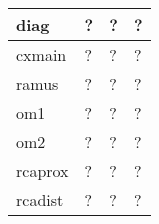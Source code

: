 \documentclass[a4paper,12pt]{article}
\begin{document}
\begin{adjustbox}{width=1\textwidth}
\begin{tabular}{|l|l|l|l|}
diag          & ?                                                              & ?             & ?                                                                                                                                                                                                                                                                                    \\ \hline
cxmain        & ?                                                              & ?             & ?                                                                                                                                                                                                                                                                                    \\ \hline
ramus         & ?                                                              & ?             & ?                                                                                                                                                                                                                                                                                    \\ \hline
om1           & ?                                                              & ?             & ?                                                                                                                                                                                                                                                                                    \\ \hline
om2           & ?                                                              & ?             & ?                                                                                                                                                                                                                                                                                    \\ \hline
rcaprox       & ?                                                              & ?             & ?                                                                                                                                                                                                                                                                                    \\ \hline
rcadist       & ?                                                              & ?             & ?                                                                                                                                                                                                                                                                                    \\ \hline

\end{tabular}
\end{adjustbox}
\end{document}
